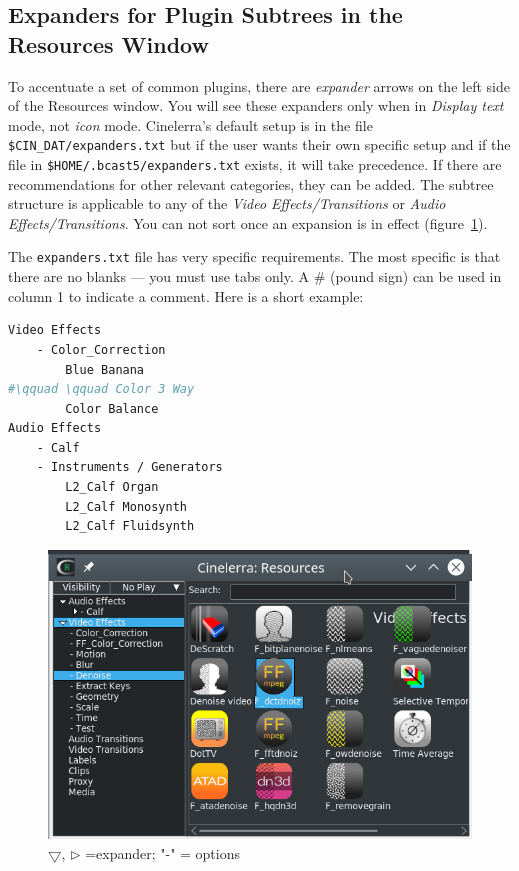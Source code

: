 \subsection{Expanders for Plugin Subtrees in the Resources Window}%
\label{sub:expanders_plugin_subtrees}

To accentuate a set of common plugins, there are \textit{expander} arrows on the left side of the Resources window. You will see these expanders only when in \textit{Display text} mode, not \textit{icon} mode. Cinelerra’s default setup is in the file \texttt{\$CIN\_DAT/expanders.txt} but if the user wants their own specific setup and if the file in \texttt{\$HOME/.bcast5/expanders.txt} exists, it will take precedence. If there are recommendations for other relevant categories, they can be added. The subtree structure is applicable to any of the \textit{Video Effects/Transitions} or \textit{Audio Effects/Transitions}. You can not sort once an expansion is in effect (figure~\ref{fig:expander}).

The \texttt{expanders.txt} file has very specific requirements. The most specific is that there are no blanks --- you must use tabs only. A \# (pound sign) can be used in column 1 to indicate a comment. Here is a short example:

\begin{lstlisting}[language=Bash]
Video Effects
    - Color_Correction
        Blue Banana
#\qquad \qquad Color 3 Way
        Color Balance
Audio Effects
    - Calf
    - Instruments / Generators
        L2_Calf Organ
        L2_Calf Monosynth
        L2_Calf Fluidsynth
\end{lstlisting}

\begin{figure}[htpb]
    \centering
    \includegraphics[width=0.8\linewidth]{images/expander.png}
    \caption{$\bigtriangledown$, $\rhd$ =expander; "-" = options}
    \label{fig:expander}
\end{figure}

